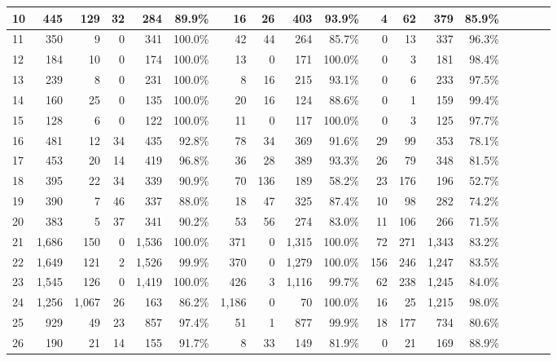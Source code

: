 \begin{table*}[t]
\begin{SmallOut}
\begin {tabular} {|l|r|r|r|r|r|r|r|r|r|r|r|r|r|r|r|r|r|}
\hline
10                        & 445  & 129 & 32 & 284 & 89.9\% & 16 & 26 & 403 & 93.9\% & 4  & 62& 379  & 85.9\%\\
\hline\hline
11                        & 350  & 9   & 0  & 341 & 100.0\%& 42 & 44 & 264 & 85.7\% & 0  & 13 & 337  & 96.3\%\\
\hline
12                        & 184 & 10   & 0 & 174  & 100.0\%& 13 & 0  & 171 & 100.0\%& 0  & 3 & 181  & 98.4\%\\
\hline
13                        & 239 & 8   & 0  & 231 & 100.0\%& 8  & 16  & 215 & 93.1\% & 0  & 6 & 233  & 97.5\%\\
\hline
14                        & 160 & 25  & 0  & 135 & 100.0\%& 20 & 16  & 124 & 88.6\% & 0  & 1 & 159  & 99.4\%\\
\hline
15                        & 128 & 6   & 0  & 122 & 100.0\%& 11 & 0  & 117 & 100.0\%& 0  & 3 & 125  & 97.7\%\\
\hline\hline
16                        & 481 & 12  & 34 & 435 & 92.8\% & 78 & 34 & 369 & 91.6\% & 29 & 99 & 353 & 78.1\%\\
\hline
17                        & 453 & 20  & 14 & 419 & 96.8\% & 36 & 28 & 389 & 93.3\% & 26 & 79 & 348 & 81.5\%\\
\hline
18                        & 395  & 22 & 34 & 339 & 90.9\% & 70 & 136& 189 & 58.2\% & 23 & 176& 196 & 52.7\%\\
\hline
19                        & 390  & 7  & 46 & 337 & 88.0\% & 18 & 47  & 325& 87.4\% & 10 & 98 & 282 & 74.2\%\\
\hline
20                        & 383  & 5  & 37 & 341 & 90.2\% & 53 & 56  & 274& 83.0\% & 11 & 106& 266 & 71.5\%\\
\hline\hline
21                        & 1,686 & 150& 0 & 1,536& 100.0\%& 371 & 0 & 1,315 & 100.0\%& 72 &271  & 1,343 & 83.2\%\\
\hline
22                        & 1,649 & 121& 2 & 1,526& 99.9\% & 370 & 0  & 1,279& 100.0\%& 156& 246& 1,247 & 83.5\%\\
\hline
23                        & 1,545 & 126& 0 & 1,419& 100.0\%& 426 & 3  & 1,116 & 99.7\% & 62 & 238& 1,245& 84.0\%\\
\hline
24                        & 1,256 &1,067& 26 & 163 & 86.2\% & 1,186& 0  & 70  & 100.0\%& 16  & 25 & 1,215& 98.0\%\\
\hline
25                        & 929   & 49  & 23 & 857 & 97.4\% & 51  & 1  & 877  & 99.9\% & 18  & 177& 734  & 80.6\%\\
\hline\hline
26                        & 190   & 21  & 14 & 155 & 91.7\% & 8   & 33 & 149  & 81.9\% & 0   & 21 & 169  & 88.9\%\\

\end{tabular}
\end{SmallOut}
\end{table*}
